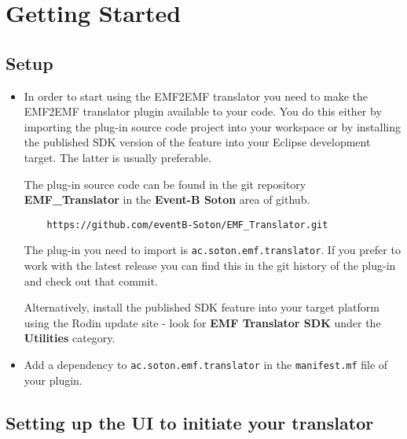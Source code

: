 \section{Getting Started}
\label{sec:getting-started}

\subsection{Setup}
\label{sec:setup}

\begin{itemize}
\item 
In order to start using the EMF2EMF translator you need to make the EMF2EMF translator plugin available to your code. 
You do this either by importing the plug-in source code project into your workspace or by installing the published SDK version of the feature into your Eclipse development target.
The latter is usually preferable.

The plug-in source code can be found in the git repository \textbf{EMF\_Translator} in the \textbf{Event-B Soton} area of github.   
\begin{verbatim}
	https://github.com/eventB-Soton/EMF_Translator.git
\end{verbatim}
The plug-in you need to import is \texttt{ac.soton.emf.translator}.
If you prefer to work with the latest release you can find this in the git history of the plug-in and check out that commit.

Alternatively, install the published SDK feature into your target platform using the Rodin update site - look for \textbf{EMF Translator SDK} under the \textbf{Utilities} category.
\item 
Add a dependency to \texttt{ac.soton.emf.translator} in the \texttt{manifest.mf} file of your plugin.
\end{itemize}

\subsection{Setting up the UI to initiate your translator}
\label{sec:ui}


